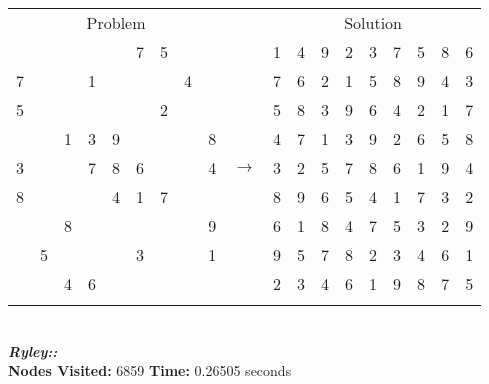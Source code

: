 \documentclass{article}
\begin{document}
\begin{tabular}{||c|c|c||c|c|c||c|c|c|| c ||c|c|c||c|c|c||c|c|c||}
  \cmidrule{1-9} \cmidrule{11-19}
  \multicolumn{9}{|c|}{Problem} &                   & \multicolumn{9}{|c|}{Solution}   \\\cmidrule{1-9} \cmidrule{11-19} \morecmidrules \cmidrule{1-9} \cmidrule{11-19}
  &   &   &   &   & 7 & 5 &   &   &  & 1 & 4 & 9 & 2 & 3 & 7 & 5 & 8 & 6\\\cmidrule{1-9} \cmidrule{11-19}
7 &   &   & 1 &   &   &   & 4 &   &  & 7 & 6 & 2 & 1 & 5 & 8 & 9 & 4 & 3\\\cmidrule{1-9} \cmidrule{11-19}
5 &   &   &   &   &   & 2 &   &   &  & 5 & 8 & 3 & 9 & 6 & 4 & 2 & 1 & 7\\\cmidrule{1-9} \cmidrule{11-19} \morecmidrules \cmidrule{1-9} \cmidrule{11-19}
  &   & 1 & 3 & 9 &   &   &   & 8 &  & 4 & 7 & 1 & 3 & 9 & 2 & 6 & 5 & 8\\\cmidrule{1-9} \cmidrule{11-19}
3 &   &   & 7 & 8 & 6 &   &   & 4 & $\rightarrow$ & 3 & 2 & 5 & 7 & 8 & 6 & 1 & 9 & 4\\\cmidrule{1-9} \cmidrule{11-19}
8 &   &   &   & 4 & 1 & 7 &   &   &  & 8 & 9 & 6 & 5 & 4 & 1 & 7 & 3 & 2\\\cmidrule{1-9} \cmidrule{11-19} \morecmidrules \cmidrule{1-9} \cmidrule{11-19}
  &   & 8 &   &   &   &   &   & 9 &  & 6 & 1 & 8 & 4 & 7 & 5 & 3 & 2 & 9\\\cmidrule{1-9} \cmidrule{11-19}
  & 5 &   &   &   & 3 &   &   & 1 &  & 9 & 5 & 7 & 8 & 2 & 3 & 4 & 6 & 1\\\cmidrule{1-9} \cmidrule{11-19}
  &   & 4 & 6 &   &   &   &   &   &  & 2 & 3 & 4 & 6 & 1 & 9 & 8 & 7 & 5\\\cmidrule{1-9} \cmidrule{11-19} \morecmidrules \cmidrule{1-9} \cmidrule{11-19}
\end{tabular}
\\
\small\emph{\textbf{Ryley::}}\\ \textbf{Nodes Visited:} 6859 \textbf{Time:} 0.26505 seconds\\
\end{document}
